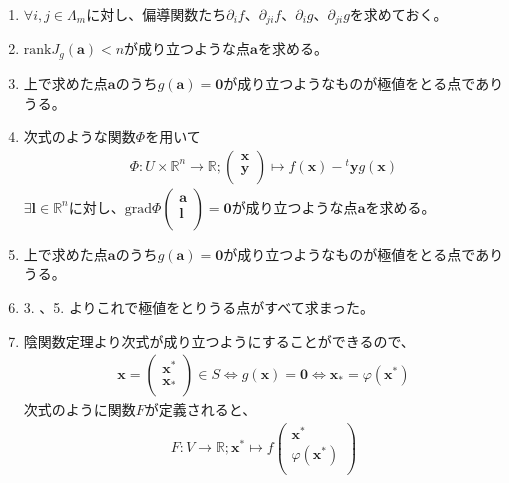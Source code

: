 \documentclass[dvipdfmx]{jsarticle}
\begin{document}
\begin{enumerate}
\item
  $\forall i,j \in \varLambda_{m}$に対し、偏導関数たち$\partial_{i}f$、$\partial_{ji}f$、$\partial_{i}g$、$\partial_{ji}g$を求めておく。
\item
  $\mathrm{rank}{J_{g}\left( \mathbf{a} \right)} < n$が成り立つような点$\mathbf{a}$を求める。
\item
  上で求めた点$\mathbf{a}$のうち$g\left( \mathbf{a} \right) = \mathbf{0}$が成り立つようなものが極値をとる点でありうる。
\item
  次式のような関数$\varPhi$を用いて
\begin{align*}
\varPhi:U \times \mathbb{R}^{n} \rightarrow \mathbb{R};\begin{pmatrix}
\mathbf{x} \\
\mathbf{y} \\
\end{pmatrix} \mapsto f\left( \mathbf{x} \right) -{}^t \mathbf{y}g\left( \mathbf{x} \right)
\end{align*}
$\exists\mathbf{l} \in \mathbb{R}^{n}$に対し、$\mathrm{grad}\varPhi\begin{pmatrix}
\mathbf{a} \\
\mathbf{l} \\
\end{pmatrix} = \mathbf{0}$が成り立つような点$\mathbf{a}$を求める。
\item
  上で求めた点$\mathbf{a}$のうち$g\left( \mathbf{a} \right) = \mathbf{0}$が成り立つようなものが極値をとる点でありうる。
\item
  3. 、5. よりこれで極値をとりうる点がすべて求まった。
\item
  陰関数定理より次式が成り立つようにすることができるので、
\begin{align*}
\mathbf{x} = \begin{pmatrix}
\mathbf{x}^{*} \\
\mathbf{x}_{*} \\
\end{pmatrix} \in S \Leftrightarrow g\left( \mathbf{x} \right) = \mathbf{0} \Leftrightarrow \mathbf{x}_{*} = \varphi\left( \mathbf{x}^{*} \right)
\end{align*}
次式のように関数$F$が定義されると、
\begin{align*}
F:V \rightarrow \mathbb{R};\mathbf{x}^{*} \mapsto f\begin{pmatrix}
\mathbf{x}^{*} \\
\varphi\left( \mathbf{x}^{*} \right) \\

\end{pmatrix}
\end{align*}
\end{enumerate}
\end{document}
